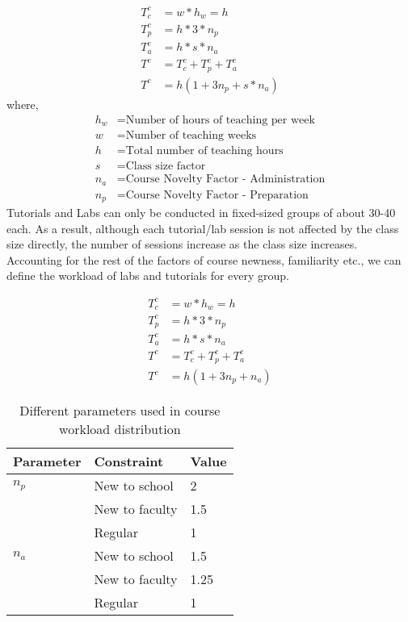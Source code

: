 \begin{equation}
\begin{aligned}
	T^c_c &= w*h_w = h  \\
    T^c_p &= h * 3 * n_p \\
    T^c_a &= h * s * n_a \\
    T^c &= T^c_c +T^c_p + T^c_a\\
    T^c &= h(1 + 3 n_p + s*n_a) 
\end{aligned}
\end{equation}
where,
\begin{equation}
\nonumber
	\begin{aligned}
	h_w &= \text{Number of hours of teaching per week}\\
    w &= \text{Number of teaching weeks}\\
    h &= \text{Total number of teaching hours}\\
    s &= \text{Class size factor}\\
    n_a &= \text{Course Novelty Factor - Administration}\\
    n_p &= \text{Course Novelty Factor - Preparation}
   	\end{aligned}
\end{equation}
Tutorials and Labs can only be conducted in fixed-sized groups of about 30-40 each. As a result, although each tutorial/lab session is not affected by the class size directly, the number of sessions increase as the class size increases. Accounting for the rest of the factors of course newness, familiarity etc., we can define the workload of labs and tutorials for every group.

\begin{equation}
\begin{aligned}
	T^c_c &= w*h_w = h  \\
    T^c_p &= h * 3 * n_p \\
    T^c_a &= h * s * n_a \\
    T^c &= T^c_c +T^c_p + T^c_a\\
    T^c &= h(1 + 3 n_p + n_a)
\end{aligned}
\end{equation}

\begin{table}
\centering
\begin{tabular}{|l|l|l|}
	\hline
	Parameter & Constraint & Value \\
    \hline
    \(n_p\) & New to school & 2 \\
     & New to faculty & 1.5 \\
     & Regular & 1 \\
    \hline
    \(n_a\) & New to school & 1.5 \\
     & New to faculty & 1.25 \\
     & Regular & 1 \\
    \hline
\end{tabular}
\caption{Different parameters used in course workload distribution}
\label{course_weightages}
\end{table}

